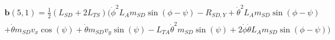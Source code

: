 \begin{linenomath*}
    \vspace{-20pt}
    \begin{multline}
        \mathbf{b}(5,1) = \frac{1}{2}(L_{SD} + 2L_{TS})(\dot\phi^2L_{A}m_{SD}\sin(\phi - \psi) - R_{SD,Y} + \dot\theta^2L_{A}m_{SD}\sin(\phi - \psi)\\ + \dot\theta m_{SD}v_x\cos(\psi) + \dot\theta m_{SD}v_y\sin(\psi) - L_{TA}\dot\theta^2m_{SD}\sin(\psi) + 2\dot\phi\dot\theta L_{A}m_{SD}\sin(\phi - \psi))
    \end{multline}
\end{linenomath*}
